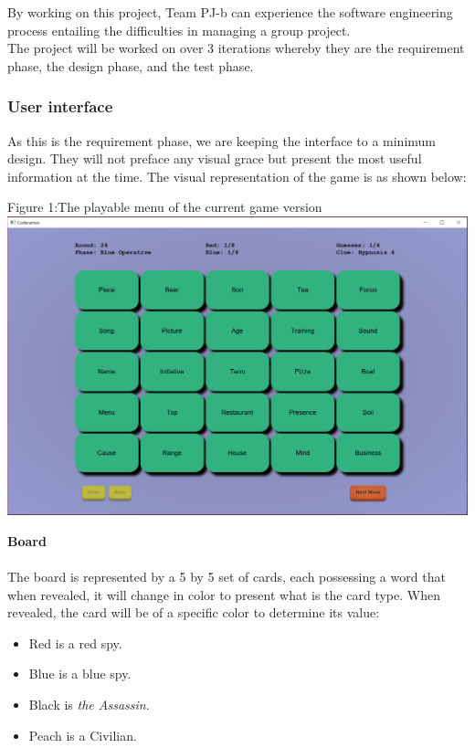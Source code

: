 \documentclass[10pt, a4paper]{article}
\begin{document}
	By working on this project, Team PJ-b can experience the software engineering process entailing the difficulties in managing a group project.\\
	
	The project will be worked on over 3 iterations whereby they are the requirement phase, the design phase, and the test phase.
	
		\subsubsection{User interface}
		
		As this is the requirement phase, we are keeping the interface to a minimum design. They will not preface any visual grace but present the most useful information at the time. The visual representation of the game is as shown below:\\
		
		\begin{center}
			Figure 1:The playable menu of the current game version
			\includegraphics[scale=0.2]{game_interface.png}
			
		\end{center}
	
		\textbf{Board}\\
		\\
		The board is represented by a 5 by 5 set of cards, each possessing a word that when revealed, it will change in color to present what is the card type. When revealed, the card will be of a specific color to determine its value:  
		    \begin{itemize}
		        \item Red is a red spy.
		        \item Blue is a blue spy.
		        \item Black is \textit{the Assassin}.
		        \item Peach is a Civilian.
		    \end{itemize}
		    
\end{document}
